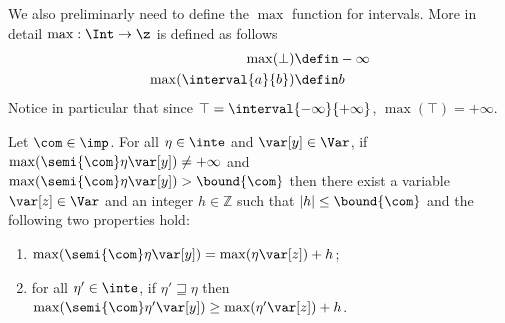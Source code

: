 We also preliminarly need to define the \(\max\) function for
intervals. More in detail \(\max : \Int \to \z\) is defined as follows
\begin{align*}
  \max(\bot) & \defin - \infty \\
  \max(\interval{a}{b}) & \defin b
\end{align*}
Notice in particular that since
\(\top = \interval{-\infty}{+\infty}\), \(\max(\top) = +\infty\).

\begin{lemma}\label{le:inc}
  Let \(\com\in \imp\).
  For all \(\eta \in \inte\) and \(\var[y] \in \Var\), if
  \(\max(\semi{\com} \eta \var[y]) \neq +\infty\) and
  \(\max(\semi{\com}\eta \var[y]) > \bound{\com}\) then there exist a
  variable \(\var[z] \in \Var\) and an integer \(h \in \mathbb{Z}\)
  such that \(|h| \leq \bound{\com}\) and the following two properties
  hold:
  \begin{enumerate}[label=(\roman*)]
  \item\label{point1} \(\max(\semi{\com}\eta \var[y]) = \max(\eta \var[z]) + h\); 
  \item\label{point2} for all \(\eta' \in \inte\), if \(\eta' \sqsupseteq \eta\)
    then
    \(\max(\semi{\com}\eta' \var[y]) \geq \max(\eta' \var[z]) + h\).
  \end{enumerate}
\end{lemma}

